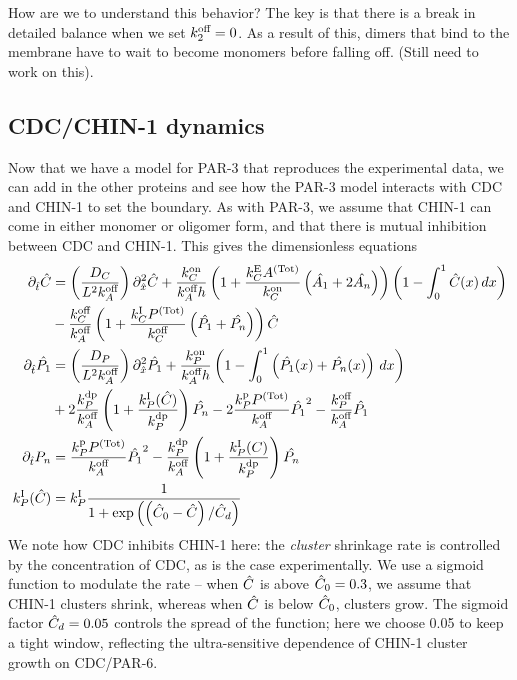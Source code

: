 \documentclass[11pt]{article}
\newcommand{\red}[1]{\color{red}#1\normalcolor}
\newcommand{\6}[1]{#1_{\text{6}}}
\newcommand{\3}[1]{#1_{\text{3}}}
\newcommand{\Tot}[1]{#1^\text{(Tot)}}
\newcommand{\A}[1]{#1_A}
\newcommand{\Chin}[1]{#1_P}
\newcommand{\C}[1]{#1_C}
\begin{document}
How are we to understand this behavior? The key is that there is a break in detailed balance when we set $k^\text{off}_2=0$. As a result of this, dimers that bind to the membrane have to wait to become monomers before falling off. \red{(Still need to work on this).}

\subsection{CDC/CHIN-1 dynamics}
Now that we have a model for PAR-3 that reproduces the experimental data, we can add in the other proteins and see how the PAR-3 model interacts with CDC and CHIN-1 to set the boundary. As with PAR-3, we assume that CHIN-1 can come in either monomer or oligomer form, and that there is mutual inhibition between CDC and CHIN-1. This gives the dimensionless equations
\begin{subequations}
\begin{align}
\Dthat \hat{\CD} &=  \left(\frac{\C{D}}{L^2 \A{\koff}}\right) \Dxhat^2  \hat{\CD} + \frac{\C{\kon}}{\A{\koff} h}\left(1 + \frac{\C{\kE} \Tot{A}}{\C{\kon}} \left(\hat{\MA}+2\hat{\PA}\right)\right)\left(1-\int_0^1  \hat{\CD}(x) \, dx\right) \\  \nonumber
&-  \frac{\C{\koff}}{\A{\koff}}\left(1+\frac{\C{\kI}\Tot{P}}{\C{\koff}} \left(\hat{\MChin}+\hat{\PChin} \right) \right) \hat{\CD}  \\
\Dthat \hat{\MChin} & =   \left(\frac{\Chin{D}}{L^2 \A{\koff}}\right) \Dxhat^2  \hat{\MChin} + \frac{\Chin{\kon}}{\A{\koff}h}\left(1-\int_0^1 \left(\hat{\MChin}(x)+\hat{\PChin}(x)\right)\, dx\right) \\
\nonumber
&+ 2\frac{\Chin{\kdp}}{\A{\koff}}\left(1+\frac{\Chin{\kI}(\hat{\CD})}{\Chin{\kdp}}\right) \hat{\PChin}  -2\frac{\Chin{\kp} \Tot{P}}{\A{\koff}} \hat{\MChin}^2 - \frac{\Chin{\koff}}{\A{\koff}}\hat{\MChin} \\ 
\Dthat \PChin & =\frac{\Chin{\kp} \Tot{P}}{\A{\koff}} \hat{\MChin}^2 -\frac{\Chin{\kdp}}{\A{\koff}}\left(1+\frac{\Chin{\kI}(\CD)}{\Chin{\kdp}}\right) \hat{\PChin} \\
\Chin{\kI}(\hat{\CD}) &=\Chin{\kI}\frac{1}{1+\exp\left(\left(\hat{\CD}_0-\hat{\CD}\right)/\hat{\CD}_d\right)}
\end{align}
\end{subequations}
We note how CDC inhibits CHIN-1 here: the \emph{cluster} shrinkage rate is controlled by the concentration of CDC, as is the case experimentally. We use a sigmoid function to modulate the rate -- when $\hat{C}$ is above $\hat{C}_0=0.3$, we assume that CHIN-1 clusters shrink, whereas when $\hat{C}$ is below $\hat{C}_0$, clusters grow. The sigmoid factor $\hat{C}_d=0.05$ controls the spread of the function; here we choose 0.05 to keep a tight window, reflecting the ultra-sensitive dependence of CHIN-1 cluster growth on CDC/PAR-6.
\end{document}
